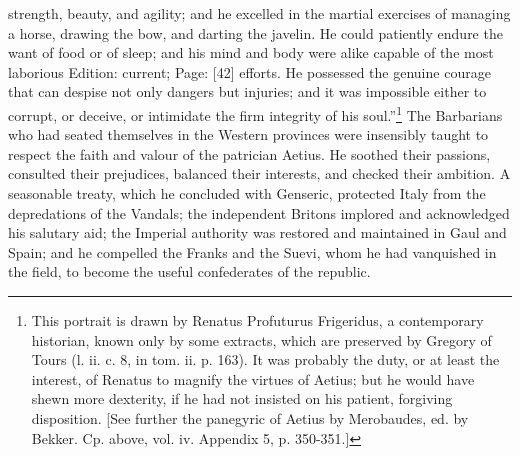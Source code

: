 strength, beauty, and agility; and he excelled in the martial exercises of managing a horse, drawing the bow, and darting the javelin. He could patiently endure the want of food or of sleep; and his mind and body were alike capable of the most laborious Edition: current; Page: [42] efforts. He possessed the genuine courage that can despise not only dangers but injuries; and it was impossible either to corrupt, or deceive, or intimidate the firm integrity of his soul.\texthebrew{}”\footnote{This portrait is drawn by Renatus Profuturus Frigeridus, a contemporary historian, known only by some extracts, which are preserved by Gregory of Tours (l. ii. c. 8, in tom. ii. p. 163). It was probably the duty, or at least the interest, of Renatus to magnify the virtues of Aetius; but he would have shewn more dexterity, if he had not insisted on his patient, forgiving disposition. [See further the panegyric of Aetius by Merobaudes, ed. by Bekker. Cp. above, vol. iv. Appendix 5, p. 350-351.]} The Barbarians who had seated themselves in the Western provinces were insensibly taught to respect the faith and valour of the patrician Aetius. He soothed their passions, consulted their prejudices, balanced their interests, and checked their ambition. A seasonable treaty, which he concluded with Genseric, protected Italy from the depredations of the Vandals; the independent Britons implored and acknowledged his salutary aid; the Imperial authority was restored and maintained in Gaul and Spain; and he compelled the Franks and the Suevi, whom he had vanquished in the field, to become the useful confederates of the republic.


